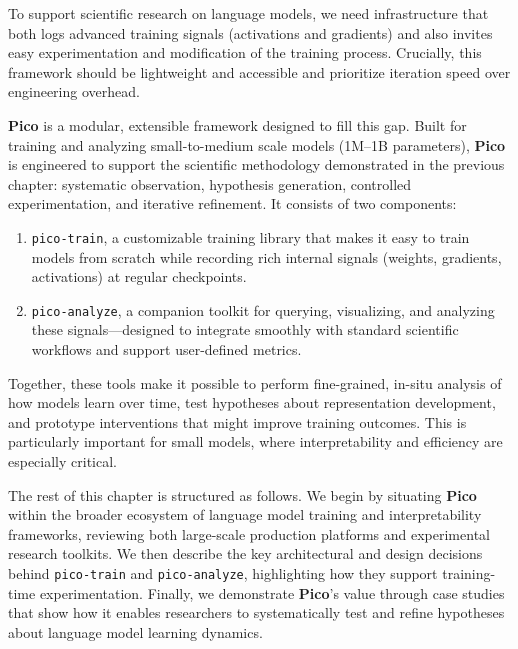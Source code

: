 To support scientific research on language models, we need infrastructure that both logs advanced training signals (activations and gradients) and also invites easy experimentation and modification of the training process. Crucially, this framework should be lightweight and accessible and prioritize iteration speed over engineering overhead. 

\textbf{Pico} is a modular, extensible framework designed to fill this gap. Built for training and analyzing small-to-medium scale models (1M--1B parameters), \textbf{Pico} is engineered to support the scientific methodology demonstrated in the previous chapter: systematic observation, hypothesis generation, controlled experimentation, and iterative refinement. It consists of two components:

\begin{enumerate}
    \item \texttt{pico-train}, a customizable training library that makes it easy to train models from scratch while recording rich internal signals (weights, gradients, activations) at regular checkpoints.
    \item \texttt{pico-analyze}, a companion toolkit for querying, visualizing, and analyzing these signals—designed to integrate smoothly with standard scientific workflows and support user-defined metrics.
\end{enumerate}

Together, these tools make it possible to perform fine-grained, in-situ analysis of how models learn over time, test hypotheses about representation development, and prototype interventions that might improve training outcomes. This is particularly important for small models, where interpretability and efficiency are especially critical.


The rest of this chapter is structured as follows. We begin by situating \textbf{Pico} within the broader ecosystem of language model training and interpretability frameworks, reviewing both large-scale production platforms and experimental research toolkits. We then describe the key architectural and design decisions behind \texttt{pico-train} and \texttt{pico-analyze}, highlighting how they support training-time experimentation. Finally, we demonstrate \textbf{Pico}'s value through case studies that show how it enables researchers to systematically test and refine hypotheses about language model learning dynamics.

